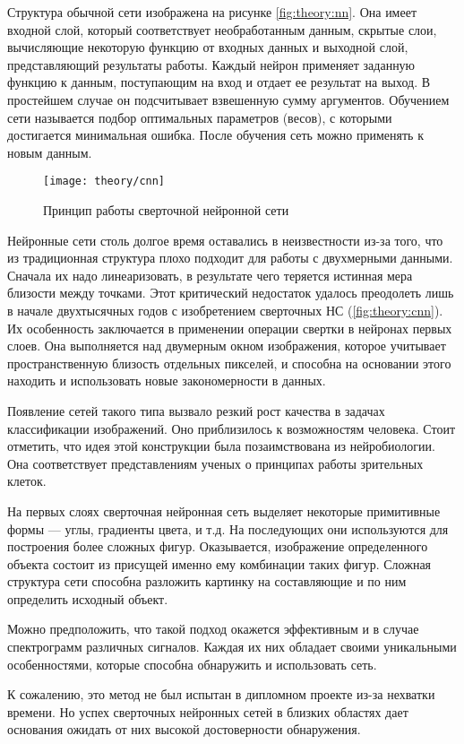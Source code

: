 Структура обычной сети изображена на рисунке \ref{fig:theory:nn}. Она имеет входной слой, который соответствует необработанным данным, скрытые слои, вычисляющие некоторую функцию от входных данных и выходной слой, представляющий результаты работы. Каждый нейрон применяет заданную функцию к данным, поступающим на вход и отдает ее результат на выход. В простейшем случае он подсчитывает взвешенную сумму аргументов. Обучением сети называется подбор оптимальных параметров (весов), с которыми достигается минимальная ошибка. После обучения сеть можно применять к новым данным.

\begin{figure}[h]
  \centering
  \texttt{[image: theory/cnn]}
  \caption{Принцип работы сверточной нейронной сети}
  \label{fig:theory:cnn}
\end{figure}

Нейронные сети столь долгое время оставались в неизвестности из-за того, что из традиционная структура плохо подходит для работы с двухмерными данными. Сначала их надо линеаризовать, в результате чего теряется истинная мера близости между точками. Этот критический недостаток удалось преодолеть лишь в начале двухтысячных годов с изобретением сверточных НС (\autoref{fig:theory:cnn}). Их особенность заключается в применении операции свертки в нейронах первых слоев. Она выполняется над двумерным окном изображения, которое учитывает пространственную близость отдельных пикселей, и способна на основании этого находить и использовать новые закономерности в данных. \cite{cnn_wiki}

Появление сетей такого типа вызвало резкий рост качества в задачах классификации изображений. Оно приблизилось к возможностям человека.
Стоит отметить, что идея этой конструкции была позаимствована из нейробиологии. Она соответствует представлениям ученых о принципах работы зрительных клеток.

На первых слоях сверточная нейронная сеть выделяет некоторые примитивные формы --- углы, градиенты цвета, и т.д. На последующих они используются для построения более сложных фигур. Оказывается, изображение определенного объекта состоит из присущей именно ему комбинации таких фигур. Сложная структура сети способна разложить картинку на составляющие и по ним определить исходный объект.

Можно предположить, что такой подход окажется эффективным и в случае спектрограмм различных сигналов. Каждая их них обладает своими уникальными особенностями, которые способна обнаружить и использовать сеть.

К сожалению, это метод не был испытан в дипломном проекте из-за нехватки времени. Но успех сверточных нейронных сетей в близких областях дает основания ожидать от них высокой достоверности обнаружения.
